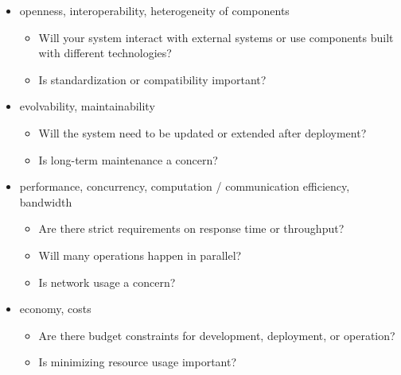 \documentclass{scrartcl}
\begin{document}
\begin{itemize}
  \item openness, interoperability, heterogeneity of components
  \begin{itemize}
    \item Will your system interact with external systems or use components built with different technologies?
    \item Is standardization or compatibility important?
  \end{itemize}

  \item evolvability, maintainability
  \begin{itemize}
    \item Will the system need to be updated or extended after deployment?
    \item Is long-term maintenance a concern?
  \end{itemize}

  \item performance, concurrency, computation / communication efficiency, bandwidth
  \begin{itemize}
    \item Are there strict requirements on response time or throughput?
    \item Will many operations happen in parallel?
    \item Is network usage a concern?
  \end{itemize}

  \item economy, costs  
  \begin{itemize}
    \item Are there budget constraints for development, deployment, or operation?
    \item Is minimizing resource usage important?
  \end{itemize}
\end{itemize}
\end{document}
